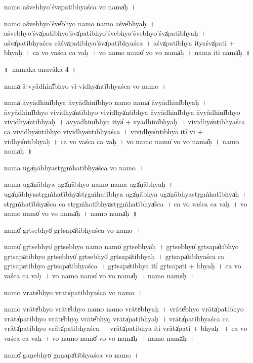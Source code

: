 \documentclass[parskip, DIV=14]{scrartcl}
\begin{document}
{namo॒ aśve॒bhyo'śva̍patibhyaśca vo॒ nama̍ḥ~।

namo॒ aśve॒bhyo'śve̎bhyo॒ namo॒ namo॒ aśve̎bhyaḥ~।
aśve॒bhyo'śva̍pati॒bhyo'śva̍pati॒bhyo'śve॒bhyo'śve॒bhyo'śva̍patibhyaḥ~।
aśva̍patibhyaśca॒ cāśva̍pati॒bhyo'śva̍patibhyaśca~।
aśva̍patibhya॒ ityaśva̍pati + bhya॒ḥ~।
ca॒ vo॒ va॒śca॒ ca॒ va॒ḥ~।
vo॒ namo॒ namo̍ vo vo॒ nama̍ḥ~।
nama॒ iti॒ nama̍ḥ~॥ 

\newpage
\LARGE
॥~namaka anuvāka 4~॥ 
\Large

nama̍ ā-vyā॒dhinī̎bhyo vi॒-vidhya̍ntībhyaśca vo॒ namo॒~।

nama̍ āvyā॒dhinī̎bhya āvyā॒dhinī̎bhyo॒ namo॒ nama̍ āvyā॒dhinī̎bhyaḥ~।
ā॒vyā॒dhinī̎bhyo vi॒vidhya̍ntībhyo vi॒vidhya̍ntībhya āvyā॒dhinī̎bhya āvyā॒dhinī̎bhyo vi॒vidhya̍ntībhyaḥ~।
ā॒vyā॒dhinī̎bhya॒ ityā̎ + vyā॒dhinī̎bhyaḥ~।
vi॒vidhya̍ntībhyaśca ca vi॒vidhya̍ntībhyo vi॒vidhya̍ntībhyaśca~।
vi॒vidhya̍ntībhya॒ iti̍ vi + vidhya̍ntībhyaḥ~।
ca॒ vo॒ va॒śca॒ ca॒ va॒ḥ~।
vo॒ namo॒ namo̍ vo vo॒ nama̍ḥ~।
namo॒ nama̍ḥ~॥ 

nama॒ uga̍ṇābhyastṛgṁha॒tībhya̍śca vo॒ namo॒~।

nama॒ uga̍ṇābhya॒  uga̍ṇābhyo॒ namo॒ nama॒ uga̍ṇābhyaḥ~।
uga̍ṇābhyastṛgṁha॒tībhya̍stṛgṁha॒tībhya॒ uga̍ṇābhya॒ uga̍ṇābhyastṛgṁha॒tībhya̍ḥ~।
stṛ॒gṁ॒ha॒tībhya̍śca ca stṛgṁha॒tībhya̍stṛgṁha॒tībhya̍śca~।
ca॒ vo॒ va॒śca॒ ca॒ va॒ḥ~।
vo॒ namo॒ namo̍ vo vo॒ nama̍ḥ~।
namo॒ nama̍ḥ~॥ 

namo̍ gṛ॒tsebhyo̍ gṛ॒tsapa̍tibhyaśca vo॒ namo॒~।

namo̍  gṛ॒tsebhyo̍ gṛ॒tsebhyo॒ namo॒  namo̍ gṛ॒tsebhya̍ḥ~।
gṛ॒tsebhyo̍ gṛ॒tsapa̍tibhyo gṛ॒tsapa̍tibhyo gṛ॒tsebhyo̍ gṛ॒tsebhyo̍ gṛ॒tsapa̍tibhyaḥ~।
gṛ॒tsapa̍tibhyaśca ca gṛ॒tsapa̍tibhyo gṛ॒tsapa̍tibhyaśca~।
gṛ॒tsapa̍tibhya॒ iti̍ gṛ॒tsapa̍ti + bhya॒ḥ~।
ca॒ vo॒ va॒śca॒ ca॒ va॒ḥ~।
vo॒ namo॒ namo̍ vo vo॒ nama̍ḥ~।
namo॒ nama̍ḥ~॥ 

namo॒ vrāte̎bhyo॒ vrāta̍patibhyaśca vo॒ namo॒~।

namo॒ vrāte̎bhyo॒ vrāte̎bhyo॒ namo॒ namo॒ vrāte̎bhyaḥ~।
vrāte̎bhyo॒ vrāta̍patibhyo॒ vrāta̍patibhyo॒ vrāte̎bhyo̱॒ vrāte̎bhyo̱॒ vrāta̍patibhyaḥ~।
vrāta̍patibhyaśca ca॒ vrāta̍patibhyo॒ vrāta̍patibhyaśca~।
vrāta̍patibhya॒ iti॒ vrāta̍pati + bhya॒ḥ ~।
ca॒ vo॒ va॒śca॒ ca॒ va॒ḥ~।
vo॒ namo॒ namo̍ vo vo॒ nama̍ḥ~।
namo॒ nama̍ḥ~॥ 

namo̍ ga॒ṇebhyo̍ ga॒ṇapa̍tibhyaśca vo॒ namo॒~।

}
\end{document}

